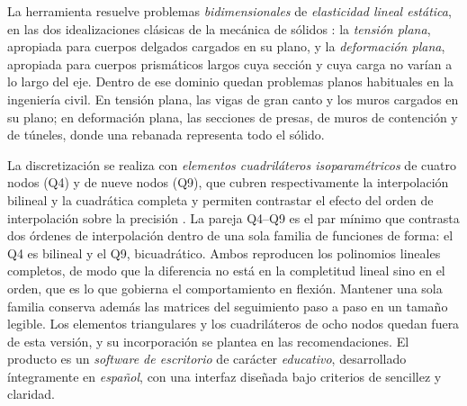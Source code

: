 La herramienta resuelve problemas \emph{bidimensionales} de \emph{elasticidad lineal estática}, en las dos idealizaciones clásicas de la mecánica de sólidos \autocite[p.~11]{timoshenko1970elasticity}: la \emph{tensión plana}, apropiada para cuerpos delgados cargados en su plano, y la \emph{deformación plana}, apropiada para cuerpos prismáticos largos cuya sección y cuya carga no varían a lo largo del eje. Dentro de ese dominio quedan problemas planos habituales en la ingeniería civil. En tensión plana, las vigas de gran canto y los muros cargados en su plano; en deformación plana, las secciones de presas, de muros de contención y de túneles, donde una rebanada representa todo el sólido.

La discretización se realiza con \emph{elementos cuadriláteros isoparamétricos} de cuatro nodos (Q4) y de nueve nodos (Q9), que cubren respectivamente la interpolación bilineal y la cuadrática completa y permiten contrastar el efecto del orden de interpolación sobre la precisión \autocites[pp.~137-138]{hughes2000fem}[pp.~164, 183-184]{onate2009structural}. La pareja Q4--Q9 es el par mínimo que contrasta dos órdenes de interpolación dentro de una sola familia de funciones de forma: el Q4 es bilineal y el Q9, bicuadrático. Ambos reproducen los polinomios lineales completos, de modo que la diferencia no está en la completitud lineal sino en el orden, que es lo que gobierna el comportamiento en flexión. Mantener una sola familia conserva además las matrices del seguimiento paso a paso en un tamaño legible. Los elementos triangulares y los cuadriláteros de ocho nodos quedan fuera de esta versión, y su incorporación se plantea en las recomendaciones. El producto es un \emph{software de escritorio} de carácter \emph{educativo}, desarrollado íntegramente en \emph{español}, con una interfaz diseñada bajo criterios de sencillez y claridad.

